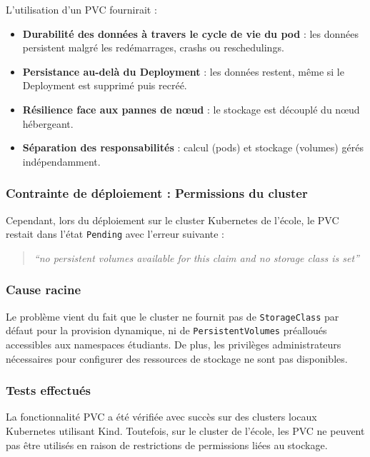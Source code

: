 \documentclass[10pt,a4paper]{article}
\begin{document}
L’utilisation d’un PVC fournirait :

\begin{itemize}
    \item \textbf{Durabilité des données à travers le cycle de vie du pod} : les données persistent malgré les redémarrages, crashs ou reschedulings.
    \item \textbf{Persistance au-delà du Deployment} : les données restent, même si le Deployment est supprimé puis recréé.
    \item \textbf{Résilience face aux pannes de nœud} : le stockage est découplé du nœud hébergeant.
    \item \textbf{Séparation des responsabilités} : calcul (pods) et stockage (volumes) gérés indépendamment.
\end{itemize}

\subsubsection*{Contrainte de déploiement : Permissions du cluster}

Cependant, lors du déploiement sur le cluster Kubernetes de l’école, le PVC restait dans l’état \texttt{Pending} avec l’erreur suivante :

\begin{quote}
\textit{``no persistent volumes available for this claim and no storage class is set''}
\end{quote}

\subsubsection{Cause racine}

Le problème vient du fait que le cluster ne fournit pas de \texttt{StorageClass} par défaut pour la provision dynamique, ni de \texttt{PersistentVolumes} préalloués accessibles aux namespaces étudiants. De plus, les privilèges administrateurs nécessaires pour configurer des ressources de stockage ne sont pas disponibles.

\subsubsection{Tests effectués}

La fonctionnalité PVC a été vérifiée avec succès sur des clusters locaux Kubernetes utilisant Kind. Toutefois, sur le cluster de l’école, les PVC ne peuvent pas être utilisés en raison de restrictions de permissions liées au stockage.
\end{document}
